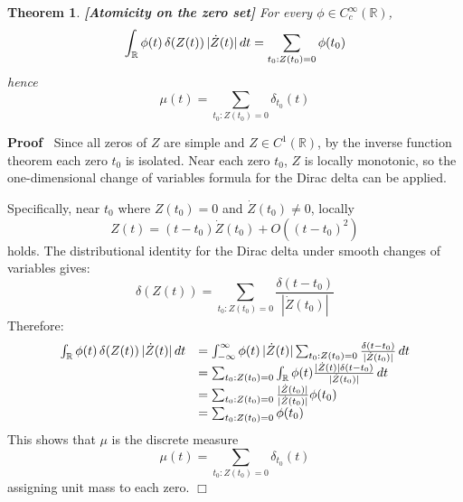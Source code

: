 \documentclass{article}
\newcommand{\tmstrong}[1]{\textbf{#1}}
\newenvironment{proof}{\noindent\textbf{Proof\ }}{\hspace*{\fill}$\Box$\medskip}
\newtheorem{theorem}{Theorem}
\begin{document}
\begin{theorem}
  {\tmstrong{[Atomicity on the zero set]\label{thm:atomic}}} For every $\phi
  \in C_c^{\infty} (\mathbb{R})$,
  \begin{equation}
    \int_{\mathbb{R}} \phi (t)  \hspace{0.17em} \delta (Z (t)) \hspace{0.17em}
    | \dot{Z} (t) |  \hspace{0.17em} dt = \sum_{t_0 : Z (t_0) = 0} \phi (t_0)
  \end{equation}
  hence
  \begin{equation}
    \mu (t) = \sum_{t_0 : Z (t_0) = 0} \delta_{t_0} (t)
  \end{equation}
\end{theorem}

\begin{proof}
  Since all zeros of $Z$ are simple and $Z \in C^1 (\mathbb{R})$, by the
  inverse function theorem each zero $t_0$ is isolated. Near each zero $t_0$,
  $Z$ is locally monotonic, so the one-dimensional change of variables formula
  for the Dirac delta can be applied.
  
  Specifically, near $t_0$ where $Z (t_0) = 0$ and $\dot{Z} (t_0) \neq 0$,
  locally
  \begin{equation}
    Z (t) = (t - t_0)  \dot{Z} (t_0) + O ((t - t_0)^2)
  \end{equation}
  holds. The distributional identity for the Dirac delta under smooth changes
  of variables gives:
  \begin{equation}
    \delta (Z (t)) = \sum_{t_0 : Z (t_0) = 0} \frac{\delta (t - t_0)}{|
    \dot{Z} (t_0) |}
  \end{equation}
  Therefore:
  \begin{equation}
    \begin{array}{ll}
      \int_{\mathbb{R}} \phi (t)  \hspace{0.17em} \delta (Z (t))
      \hspace{0.17em} | \dot{Z} (t) |  \hspace{0.17em} dt & = \int_{-
      \infty}^{\infty} \phi (t) \hspace{0.17em} | \dot{Z} (t) |  \sum_{t_0 : Z
      (t_0) = 0} \frac{\delta (t - t_0)}{| \dot{Z} (t_0) |}  \hspace{0.17em}
      dt\\
      & = \sum_{t_0 : Z (t_0) = 0} \int_{\mathbb{R}} \phi (t) \frac{| \dot{Z}
      (t) | \delta (t - t_0)}{| \dot{Z} (t_0) |}  \hspace{0.17em} dt\\
      & = \sum_{t_0 : Z (t_0) = 0} \frac{| \dot{Z} (t_0) |}{| \dot{Z} (t_0)
      |} \phi (t_0)\\
      & = \sum_{t_0 : Z (t_0) = 0} \phi (t_0)
    \end{array}
  \end{equation}
  This shows that $\mu$ is the discrete measure
  \begin{equation}
    \mu (t) = \sum_{t_0 : Z (t_0) = 0} \delta_{t_0} (t)
  \end{equation}
  assigning unit mass to each zero.
\end{proof}
\end{document}
